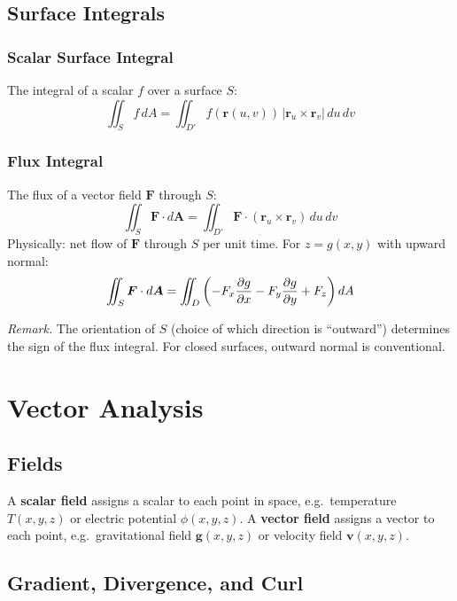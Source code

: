 \documentclass[11pt, letterpaper]{article}
\theoremstyle{plain}
\newenvironment{remark}{\smallskip\noindent\textit{Remark.}}{\smallskip}
\newcommand{\vv}[1]{\bm{#1}}
\begin{document}
\subsection{Surface Integrals}

\subsubsection*{Scalar Surface Integral}
The integral of a scalar $f$ over a surface $S$:
\[
    \iint_S f\,dA = \iint_{D'} f(\vv{r}(u,v))\,|\vv{r}_u\times\vv{r}_v|\,du\,dv
\]

\subsubsection*{Flux Integral}
The flux of a vector field $\vv{F}$ through $S$:
\[
    \iint_S \vv{F}\cdot d\vv{A} = \iint_{D'} \vv{F}\cdot(\vv{r}_u\times\vv{r}_v)\,du\,dv
\]
Physically: net flow of $\vv{F}$ through $S$ per unit time.
For $z = g(x,y)$ with upward normal:
\[
    \iint_S \vv{F}\cdot d\vv{A}
    = \iint_D \left(-F_x\pdv{g}{x} - F_y\pdv{g}{y} + F_z\right)dA
\]

\begin{remark}
    The orientation of $S$ (choice of which direction is ``outward'')
    determines the sign of the flux integral. For closed surfaces,
    outward normal is conventional.
\end{remark}


\newpage
\section{Vector Analysis}                      %

\subsection{Fields}

A \textbf{scalar field} assigns a scalar to each point in space, e.g.\
temperature $T(x,y,z)$ or electric potential $\phi(x,y,z)$.
A \textbf{vector field} assigns a vector to each point, e.g.\
gravitational field $\vv{g}(x,y,z)$ or velocity field $\vv{v}(x,y,z)$.


\subsection{Gradient, Divergence, and Curl}
\end{document}
